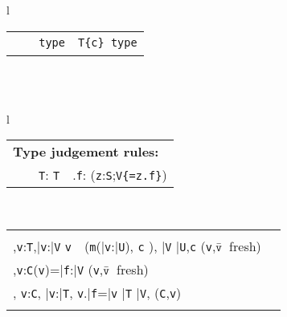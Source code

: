 \begin{figure*}
\begin{tabular}{l}
{\begin{tabular}{p{}p{}p{}}
\infrule[Class]
	{\Gamma \vdash \klass({\tt C})}
	{\Gamma \vdash {\tt C}\ \type} 
&
\infrule[Exist-T]
	{\Gamma\tt \vdash {\tt S}\ \type, {\tt T}\ \type}
	{\Gamma\tt \vdash {\tt x:S;T}\ {\tt type}} 
&
\infrule[Dep]
	{\Gamma\tt \vdash T\ \type \andalso \Gamma, \self:T \vdash c:o}
	{\Gamma\tt \vdash T\{c\}\ {\tt type}} 
\\
\end{tabular}}
\quad\\
\quad\\
{\tabcolsep=0pt
\begin{tabular}{l}
\begin{tabular}{p{}p{}p{}}
\multicolumn{3}{l}{\bf Type judgement rules:}\\
\infax[T-Var]
      {\Gamma, {\tt x}:{\tt T} \vdash {\tt x}:{\tt T\{\self==x\}}}
&
\infrule[T-Cast]
	{\Gamma \vdash {\tt e}:{\tt U} \andalso \Gamma \vdash {\tt T} \ \type}
	{\Gamma \vdash {\tt e}\ \as\ {\tt T}: {\tt T}} &
\infrule[T-Field]
	{\Gamma \vdash {\tt e}: {\tt S} \andalso \Gamma,{\tt z}:{\tt S}\vdash {\tt z}\ \has\ {\tt f}:{\tt V} \andalso \mbox{({\tt z} fresh)} }
	{\Gamma \vdash {\tt e}.{\tt f}:  ({\tt z}:{\tt S};{\tt V\{\self=z.f\}})}
\end{tabular}\\
\begin{tabular}{p{}p{}} 
\infrule[T-Invk]
	{\Gamma \vdash {\tt e}:{\tt T},\bar{\tt e}:\bar{\tt V} \andalso \\
	  \Gamma,{\tt v}:{\tt T},\bar{\tt v}:\bar{\tt V} \vdash
		{\tt v}\ \has\ ({\tt m}(\bar{\tt v}:\bar{\tt U}), {\tt c} \rightarrow {\tt S}), 
		\bar{\tt V} \subtype \bar{\tt U},{\tt c} 
	  \andalso \mbox{({\tt v},$\bar{\tt v}$ fresh)}}
	{\Gamma \vdash {\tt e}.{\tt m}(\bar{\tt e}): ({\tt v}:{\tt T};\bar{\tt v}:\bar{\tt V};S)}
	&
\infrule[T-New]
	{\Gamma \vdash \bar{\tt e}:\bar{\tt T} \andalso \vdash \klass({\tt C}) \\ 
	  \Gamma,{\tt v}:{\tt C}\vdash \fields({\tt v})=\bar{\tt f}:\bar{\tt V}  \andalso \mbox{({\tt v},$\bar{\tt v}$\ fresh)}\\
	  \Gamma, {\tt v}:{\tt C}, \bar{\tt v}:\bar{\tt T}, {\tt v}.\bar{\tt f}=\bar{\tt v} 
	  \vdash \bar{\tt T} \subtype \bar{\tt V}, \inv({\tt C},{\tt v})}
	{\Gamma \vdash \new\ {\tt C}(\bar{\tt e}): {\tt C}\{\bar{\tt v}:\bar{\tt T}; \new\ {\tt C}(\bar{\tt v})=\self, \inv({\tt C},\self)\}}\\
\infrule[Method OK]
	{\this:{\tt C}\vdash {\tt c}:o \andalso \this:{\tt C},\bar{\tt x}:\bar{\tt V},{\tt c} \vdash {\tt T} \ \type, \bar{\tt V} \ \type, 
}
\end{tabular}
\end{tabular}}
\end{tabular}
\end{figure*}
